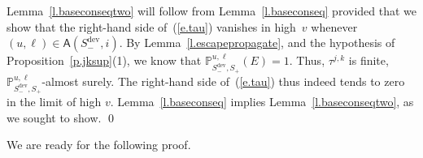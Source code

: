 \documentclass[letterpaper,11pt,oneside,reqno]{amsbook}
\newcommand{\PP}{\ensuremath{\mathbb{P}}}
\numberwithin{figure}{chapter}
\theoremstyle{definition}
\theoremstyle{definition}
\theoremstyle{definition}
\theoremstyle{definition}
\theoremstyle{definition}
\newcommand\pgameplay[3]{\PP^{#3}_{#1,#2}}
\newcommand{\access}{\mathsf{A}}
\newcommand{\sdev}{S_-^{\textrm{dev}}}
\begin{document}

Lemma~\ref{l.baseconseqtwo} will follow from  Lemma~\ref{l.baseconseq} provided
that we show that  the right-hand side of~(\ref{e.tau}) vanishes in high~$v$ whenever $(u,\ell) \in \access(\sdev,i)$.
By Lemma~\ref{l.escapepropagate}, and the hypothesis of Proposition~\ref{p.jksup}(1), we know that  $\pgameplay{\sdev}{S_+}{u,\ell}(E) = 1$.
 Thus, $\tau^{j,k}$ is finite, $\pgameplay{\sdev}{S_+}{u,\ell}$-almost surely.  
The right-hand side of~(\ref{e.tau}) thus indeed tends to zero in the limit of high $v$. Lemma~\ref{l.baseconseq} implies  Lemma~\ref{l.baseconseqtwo}, as we sought to show. \qed

 We are ready for the following proof. 
 
\end{document}
